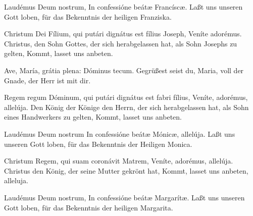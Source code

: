 \documentclass[fontsize=9pt,paper=A6,twoside,BCOR=1mm,DIV=22,headinclude]{scrarticle}
\begin{document}
\pagebreak
{}
\begin{paracol}{2}\pcb
	Laudémus Deum nostrum, \red{*} In confessióne beátæ Francíscæ.
	\switchcolumn 
	Laßt uns unseren Gott loben, \red{*} für das Bekenntnis der heiligen Franziska.
\end{paracol}

\begin{paracol}{2}\pcb
	Christum Dei Fílium, qui putári dignátus est fílius Joseph, \red{*} Veníte adorémus. \TPA
	\switchcolumn 
	Christus, den Sohn Gottes, der sich herabgelassen hat, als Sohn Josephs zu gelten, \red{*} Kommt, lasset uns anbeten. \OZA
\end{paracol}

\begin{paracol}{2}\pcb
	Ave, María, grátia plena: \red{*} Dóminus tecum. \TPA
	\switchcolumn 
	Gegrüßest seist du, Maria, voll der Gnade, \red{*} der Herr ist mit dir. \OZA
\end{paracol}

\begin{paracol}{2}\pcb
	Regem regum Dóminum, qui putári dignátus est fabri fílius, \red{*} Veníte, adorémus, allelúja.
	\switchcolumn 
	Den König der Könige den Herrn, der sich herabgelassen hat, als Sohn eines Handwerkers zu gelten, \red{*} Kommt, lasset uns anbeten.
\end{paracol}

\begin{paracol}{2}\pcb
	Laudémus Deum nostrum \red{*} In confessióne beátæ Mónicæ, allelúja. 
	\switchcolumn 
	Laßt uns unseren Gott loben, \red{*} für das Bekenntnis der Heiligen Monica.
\end{paracol}

\begin{paracol}{2}\pcb
	Christum Regem, qui suam coronávit Matrem, \red{*} Veníte, adorémus, allelúja.
	\switchcolumn 
	Christus den König, der seine Mutter gekrönt hat, \red{*} Kommt, lasset uns anbeten, alleluja.
\end{paracol}

\pagebreak
{}
\begin{paracol}{2}\pcb
	Laudémus Deum nostrum, \red{*} In confessióne beátæ Margarítæ. \TPA
	\switchcolumn 
	Laßt uns unseren Gott loben, \red{*} für das Bekenntnis der heiligen Margarita. \OZA
\end{paracol}
\end{document}
